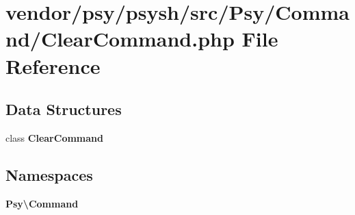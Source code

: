 \section{vendor/psy/psysh/src/\+Psy/\+Command/\+Clear\+Command.php File Reference}
\label{psy_2psysh_2src_2_psy_2_command_2_clear_command_8php}
\subsection*{Data Structures}
\begin{DoxyCompactItemize}
\item 
class {\bf Clear\+Command}
\end{DoxyCompactItemize}
\subsection*{Namespaces}
\begin{DoxyCompactItemize}
\item 
 {\bf Psy\textbackslash{}\+Command}
\end{DoxyCompactItemize}
